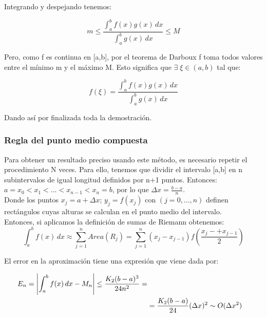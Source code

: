 \documentclass{article}
\begin{document}
			Integrando y despejando tenemos:
			
			\begin{equation}
				m \leq \frac{\int_{a}^{b} f(x)g(x) \,dx }{\int_{a}^{b} g(x) \,dx } \leq M 
			\end{equation}
			
			Pero, como f es continua en [a,b], por el teorema de Darboux f toma todos  valores entre el mínimo m y el máximo M.  Esto significa que $\exists\; \xi \in (a,b)$ tal que:
			
			\begin{equation}
				f(\xi)=\frac{\int_{a}^{b} f(x)g(x) \,dx }{\int_{a}^{b} g(x) \,dx }
			\end{equation}
			
			Dando así por finalizada toda la demostración.\\
			
			\subsubsection{Regla del punto medio compuesta}
			
			Para obtener un resultado preciso usando este método, es necesario repetir el procedimiento N veces. Para ello, tenemos que  dividir el intervalo [a,b] en n subintervalos de igual longitud definidos por n+1 puntos. Entonces: $a=x_0<x_1<...<x_{n-1}<x_n=b$, por lo que $\Delta x=\frac{b-a}{n}$. \\
			
			Donde los puntos $x_j=a+\Delta x$; $y_j=f(x_j)$ con $(j=0,...,n)$ definen  rectángulos cuyas alturas se calculan en el punto medio del intervalo. \\
			
			Entonces, si aplicamos la definición de sumas de Riemann obtenemos:
			\begin{equation}
				\int_{a}^{b} f(x) \,dx \approx \sum_{j = 1}^{n} Area(R_j)=\sum_{j = 1}^{n} (x_j-x_{j-1})f(\frac{x_j-+x_{j-1}}{2} )   
			\end{equation}
			
			El error en la aproximación tiene una expresión que viene dada por:
			
			\begin{align}
				E_n=\left\lvert \int_{a}^{b} f(x) \,dx-M_n \right\rvert \leq \frac{K_2(b-a){^3}}{24n^2}= \notag \\
				&=\frac{K_2(b-a)}{24}(\Delta x){^2}\sim O(\Delta x^2)     
			\end{align}
			
\end{document}
